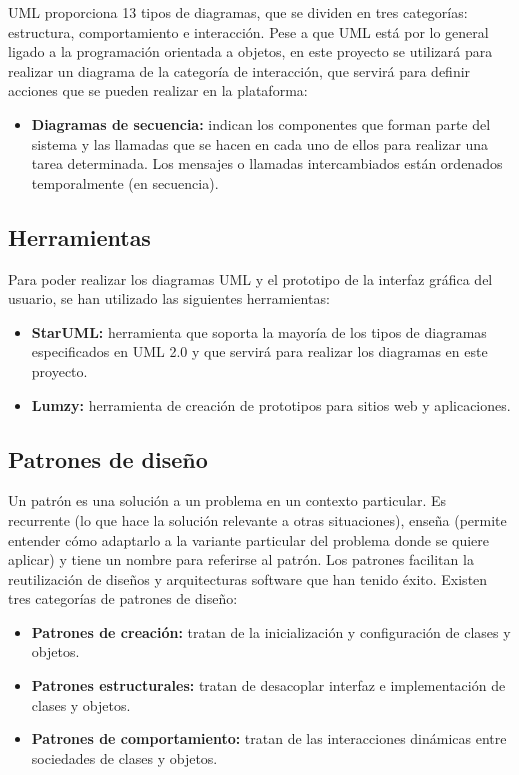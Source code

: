 UML proporciona 13 tipos de diagramas, que se dividen en tres categorías: estructura, comportamiento e interacción. Pese a que UML está por lo general ligado a la programación orientada a objetos, en este proyecto se utilizará para realizar un diagrama de la categoría de interacción, que servirá para definir acciones que se pueden realizar en la plataforma:

\noindent
\begin{itemize}
\item \textbf{Diagramas de secuencia:} indican los componentes que forman parte del sistema y las llamadas que se hacen en cada uno de ellos para realizar una tarea determinada. Los mensajes o llamadas intercambiados están ordenados temporalmente (en secuencia).
\end{itemize}

\subsection{Herramientas}
Para poder realizar los diagramas UML y el prototipo de la interfaz gráfica del usuario, se han utilizado las siguientes herramientas:

\begin{itemize}
\item \textbf{StarUML:} herramienta que soporta la mayoría de los tipos de diagramas especificados en UML 2.0 y que servirá para realizar los diagramas en este proyecto.
\item \textbf{Lumzy:} herramienta de creación de prototipos para sitios web y aplicaciones.
\end{itemize}

\subsection{Patrones de diseño}
Un patrón es una solución a un problema en un contexto particular. Es recurrente (lo que hace la solución relevante a otras situaciones), enseña (permite entender cómo adaptarlo a la variante particular del problema donde se quiere aplicar) y tiene un nombre para referirse al patrón. Los patrones facilitan la reutilización de diseños y arquitecturas software que han tenido éxito. Existen tres categorías de patrones de diseño:
\begin{itemize}
\item \textbf{Patrones de creación:} tratan de la inicialización y configuración de clases y objetos.
\item \textbf{Patrones estructurales:} tratan de desacoplar interfaz e implementación de clases y objetos.
\item \textbf{Patrones de comportamiento:} tratan de las interacciones dinámicas entre sociedades de clases y objetos.
\end{itemize}

